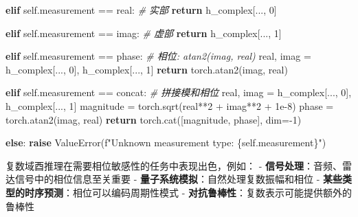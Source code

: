 \documentclass[
  12pt,
]{article}
\newenvironment{Shaded}{}{}
\newcommand{\CommentTok}[1]{\textcolor[rgb]{0.38,0.63,0.69}{\textit{#1}}}
\newcommand{\ControlFlowTok}[1]{\textcolor[rgb]{0.00,0.44,0.13}{\textbf{#1}}}
\newcommand{\DecValTok}[1]{\textcolor[rgb]{0.25,0.63,0.44}{#1}}
\newcommand{\FloatTok}[1]{\textcolor[rgb]{0.25,0.63,0.44}{#1}}
\newcommand{\NormalTok}[1]{#1}
\newcommand{\OperatorTok}[1]{\textcolor[rgb]{0.40,0.40,0.40}{#1}}
\newcommand{\PreprocessorTok}[1]{\textcolor[rgb]{0.74,0.48,0.00}{#1}}
\newcommand{\SpecialCharTok}[1]{\textcolor[rgb]{0.25,0.44,0.63}{#1}}
\newcommand{\SpecialStringTok}[1]{\textcolor[rgb]{0.73,0.40,0.53}{#1}}
\newcommand{\StringTok}[1]{\textcolor[rgb]{0.25,0.44,0.63}{#1}}
\newcommand{\VariableTok}[1]{\textcolor[rgb]{0.10,0.09,0.49}{#1}}
\begin{document}
\begin{Shaded}
\begin{Highlighting}[]
        \ControlFlowTok{elif} \VariableTok{self}\NormalTok{.measurement }\OperatorTok{==} \StringTok{\textquotesingle{}real\textquotesingle{}}\NormalTok{:}
            \CommentTok{\# 实部}
            \ControlFlowTok{return}\NormalTok{ h\_complex[..., }\DecValTok{0}\NormalTok{]}
        
        \ControlFlowTok{elif} \VariableTok{self}\NormalTok{.measurement }\OperatorTok{==} \StringTok{\textquotesingle{}imag\textquotesingle{}}\NormalTok{:}
            \CommentTok{\# 虚部}
            \ControlFlowTok{return}\NormalTok{ h\_complex[..., }\DecValTok{1}\NormalTok{]}
        
        \ControlFlowTok{elif} \VariableTok{self}\NormalTok{.measurement }\OperatorTok{==} \StringTok{\textquotesingle{}phase\textquotesingle{}}\NormalTok{:}
            \CommentTok{\# 相位: atan2(imag, real)}
\NormalTok{            real, imag }\OperatorTok{=}\NormalTok{ h\_complex[..., }\DecValTok{0}\NormalTok{], h\_complex[..., }\DecValTok{1}\NormalTok{]}
            \ControlFlowTok{return}\NormalTok{ torch.atan2(imag, real)}
        
        \ControlFlowTok{elif} \VariableTok{self}\NormalTok{.measurement }\OperatorTok{==} \StringTok{\textquotesingle{}concat\textquotesingle{}}\NormalTok{:}
            \CommentTok{\# 拼接模和相位}
\NormalTok{            real, imag }\OperatorTok{=}\NormalTok{ h\_complex[..., }\DecValTok{0}\NormalTok{], h\_complex[..., }\DecValTok{1}\NormalTok{]}
\NormalTok{            magnitude }\OperatorTok{=}\NormalTok{ torch.sqrt(real}\OperatorTok{**}\DecValTok{2} \OperatorTok{+}\NormalTok{ imag}\OperatorTok{**}\DecValTok{2} \OperatorTok{+} \FloatTok{1e{-}8}\NormalTok{)}
\NormalTok{            phase }\OperatorTok{=}\NormalTok{ torch.atan2(imag, real)}
            \ControlFlowTok{return}\NormalTok{ torch.cat([magnitude, phase], dim}\OperatorTok{={-}}\DecValTok{1}\NormalTok{)}
        
        \ControlFlowTok{else}\NormalTok{:}
            \ControlFlowTok{raise} \PreprocessorTok{ValueError}\NormalTok{(}\SpecialStringTok{f"Unknown measurement type: }\SpecialCharTok{\{}\VariableTok{self}\SpecialCharTok{.}\NormalTok{measurement}\SpecialCharTok{\}}\SpecialStringTok{"}\NormalTok{)}
\end{Highlighting}
\end{Shaded}

复数域酉推理在需要相位敏感性的任务中表现出色，例如： -
\textbf{信号处理}：音频、雷达信号中的相位信息至关重要 -
\textbf{量子系统模拟}：自然处理复数振幅和相位 -
\textbf{某些类型的时序预测}：相位可以编码周期性模式 -
\textbf{对抗鲁棒性}：复数表示可能提供额外的鲁棒性
\end{document}
